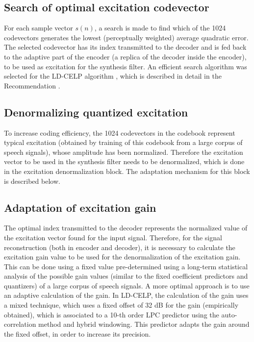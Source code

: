 \subsection{Search of optimal excitation codevector}

For each sample vector $s(n)$, a search is made to find which of the
1024 codevectors generates the lowest (perceptually weighted) average
quadratic error. The selected codevector has its index transmitted to
the decoder and is fed back to the adaptive part of the encoder (a
replica of the decoder inside the encoder), to be used as excitation
for the synthesis filter. An efficient search algorithm was selected
for the LD-CELP algorithm 
\cite{LD-CELP-Phase1:HQLD,LD-CELP-Phase1:Globecom}, which is described
in detail in the Recommendation \cite{G.728}.


\subsection{Denormalizing quantized excitation} 

To increase coding efficiency, the 1024 codevectors in the codebook
represent typical excitation (obtained by training of this codebook
from a large corpus of speech signals), whose amplitude has been
normalized. Therefore the excitation vector to be used in the
synthesis filter needs to be denormalized, which is done in the
excitation denormalization block. The adaptation mechanism for this
block is described below.


\subsection{Adaptation of excitation gain}

The optimal index transmitted to the decoder represents the
normalized value of the excitation vector found for the input
signal. Therefore, for the signal reconstruction (both in encoder and
decoder), it is necessary to calculate the excitation gain value to be
used for the denormalization of the excitation gain. This can be done
using a fixed value pre-determined using a long-term statistical
analysis of the possible gain values (similar to the fixed coefficient
predictors and quantizers) of a large corpus of speech
signals. A more optimal approach is to use an adaptive calculation of the
gain. In LD-CELP, the calculation of the gain uses a mixed technique,
which uses a fixed offset of 32 dB for the gain (empirically
obtained), which is associated to a 10-th order LPC predictor using
the auto-correlation method and hybrid windowing. This predictor
adapts the gain around the fixed offset, in order to increase its precision.


